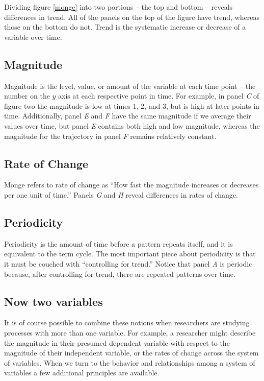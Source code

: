 \documentclass[english,,man]{apa6}
\theoremstyle{definition}
\theoremstyle{definition}
\theoremstyle{definition}
\theoremstyle{remark}
\begin{document}
Dividing figure \ref{monge} into two portions -- the top and bottom --
reveals differences in trend. All of the panels on the top of the figure
have trend, whereas those on the bottom do not. Trend is the systematic
increase or decrease of a variable over time.

\hypertarget{magnitude}{%
\subsection{Magnitude}\label{magnitude}}

Magnitude is the level, value, or amount of the variable at each time
point -- the number on the \(y\) axis at each respective point in time.
For example, in panel \emph{C} of figure two the magnitude is low at
times 1, 2, and 3, but is high at later points in time. Additionally,
panel \emph{E} and \emph{F} have the same magnitude if we average their
values over time, but panel \emph{E} contains both high and low
magnitude, whereas the magnitude for the trajectory in panel \emph{F}
remains relatively constant.

\hypertarget{rate-of-change}{%
\subsection{Rate of Change}\label{rate-of-change}}

Monge refers to rate of change as \enquote{How fast the magnitude
increases or decreases per one unit of time.} Panels \emph{G} and
\emph{H} reveal differences in rates of change.

\hypertarget{periodicity}{%
\subsection{Periodicity}\label{periodicity}}

Periodicity is the amount of time before a pattern repeats itself, and
it is equivalent to the term cycle. The most important piece about
periodicity is that it must be couched with \enquote{controlling for
trend.} Notice that panel \emph{A} is periodic because, after
controlling for trend, there are repeated patterns over time.

\hypertarget{now-two-variables}{%
\subsection{Now two variables}\label{now-two-variables}}

It is of course possible to combine these notions when researchers are
studying processes with more than one variable. For example, a
researcher might describe the magnitude in their presumed dependent
variable with respect to the magnitude of their independent variable, or
the rates of change across the system of variables. When we turn to the
behavior and relationships among a system of variables a few additional
principles are available.
\end{document}
